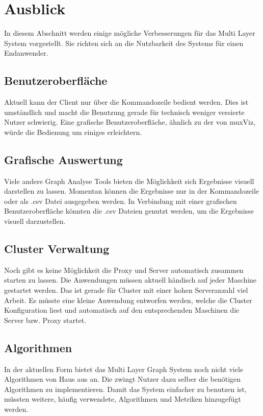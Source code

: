 \section{Ausblick}

In diesem Abschnitt werden einige mögliche Verbesserungen für das Multi Layer System vorgestellt.
Sie richten sich an die Nutzbarkeit des Systems für einen Endanwender.


\subsection{Benutzeroberfläche}

Aktuell kann der Client nur über die Kommandozeile bedient werden. Dies ist umständlich und macht die Benutzung gerade für technisch weniger versierte Nutzer schwierig.
Eine grafische Benutzeroberfläche, ähnlich zu der von muxViz, würde die Bedienung um einiges erleichtern. 

\subsection{Grafische Auswertung}

Viele andere Graph Analyse Tools bieten die Möglichkeit sich Ergebnisse visuell darstellen zu lassen. Momentan können die Ergebnisse nur in der Kommandozeile oder als .csv Datei ausgegeben werden.
In Verbindung mit einer grafischen Benutzeroberfläche könnten die .csv Dateien genutzt werden, um die Ergebnisse visuell darzustellen.

\subsection{Cluster Verwaltung}

Noch gibt es keine Möglichkeit die Proxy und Server automatisch zusammen starten zu lassen. Die Anwendungen müssen aktuell händisch auf jeder Maschine gestartet werden. Das ist gerade für Cluster mit einer hohen Serveranzahl viel Arbeit.
Es müsste eine kleine Anwendung entworfen werden, welche die Cluster Konfiguration liest und automatisch auf den entsprechenden Maschinen die Server bzw. Proxy startet.

\subsection{Algorithmen}

In der aktuellen Form bietet das Multi Layer Graph System noch nicht viele Algorithmen von Haus aus an. Die zwingt Nutzer dazu selber die benötigen Algorithmen zu implementieren. Damit das System einfacher zu benutzen ist,
müssten weitere, häufig verwendete, Algorithmen und Metriken hinzugefügt werden.


